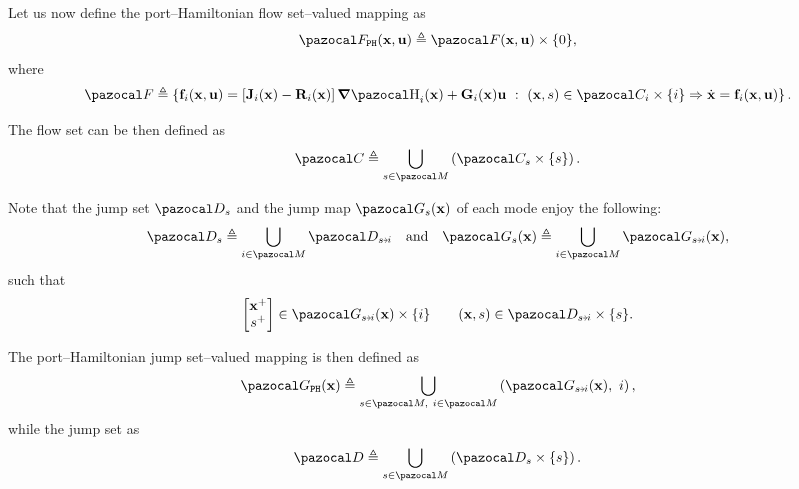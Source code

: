 Let us now define the port--Hamiltonian flow set--valued mapping as
%
\begin{equation}\label{eq:hph_flowmap}
    \F_{\tt PH}(\xb,\ub) \triangleq \F(\xb,\ub)\times\{0\},
\end{equation}
%
where
%
\begin{equation}
    \F\triangleq\left\{\mathbf{f}_i(\xb,\ub) = \left[\Jb_i(\xb)-\Rb_i(\xb)\right]\dH_i(\xb) + \Gb_i(\xb)\ub~:~(\xb,s)\in\C_i\times\{i\}\Rightarrow \dot{\xb} = \mathbf{f}_i(\xb,\ub)\right\}.
\end{equation}
%

The flow set can be then defined as
%
\begin{equation}
    \C\triangleq\bigcup_{s\in\M}\left(\C_s\times\{s\}\right).
\end{equation}
%

Note that the jump set $\D_s$ and the jump map $\G_s(\xb)$ of each mode enjoy the following:
%
\begin{equation}
    \D_s\triangleq \bigcup_{i\in\M}\D_{s\Arrow{0.1cm} i}~~\text{ and }~~\G_s(\xb)\triangleq \bigcup_{i\in\M}\G_{s\Arrow{0.1cm}i}(\xb),
\end{equation}
%
such that 
%
\begin{equation}
    \begin{bmatrix}
        \xb^+\\
        s^+    
    \end{bmatrix}
    \in
    \G_{s\Arrow{0.1cm}i}(\xb)\times\{i\}
    \qquad (\xb,s)\in\D_{s\Arrow{0.1cm}i}\times\{s\}.
\end{equation}
%

The port--Hamiltonian jump set--valued mapping is then defined as
%
\begin{equation}\label{eq:hph_jumpmap}
    \G_{\tt PH}(\x) \triangleq\bigcup_{s\in\M,~i\in\M}\left(\G_{s\Arrow{0.1cm}i}(\xb),~i\right),
\end{equation}
%
while the jump set as
%
\begin{equation}\label{eq:hph_jumpset}
    \D \triangleq \bigcup_{s\in\M}\left(\D_s\times\{s\}\right).
\end{equation}
%

